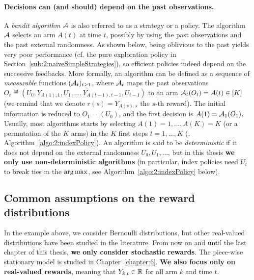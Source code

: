 \paragraph{Decisions can (and should) depend on the past observations.}

A \emph{bandit algorithm} $\mathcal{A}$ is also referred to as a strategy or a policy.
The algorithm $\mathcal{A}$ selects an arm $A(t)$ at time $t$, possibly by using the past observations and the past external randomness.
As shown below, being oblivious to the past yields very poor performance (cf. the pure exploration policy in Section~\ref{sub:2:naiveSimpleStrategies}), so efficient policies indeed depend on the successive feedbacks.
%
More formally, an algorithm can be defined as a sequence of \emph{measurable} functions $(\mathcal{A}_t)_{t\geq1}$,
where $\mathcal{A}_t$ maps the past observations $O_t \eqdef (U_0, Y_{A(1),1}, U_1, \dots, Y_{A(t-1),t-1}, U_{t-1})$
to an arm $\mathcal{A}_t(O_t) \overset{.}{=} A(t) \in[K]$
(we remind that we denote $r(s) = Y_{A(s),s}$ the $s$-th reward).
The initial information is reduced to $O_1 = (U_0)$, and the first decision is $A(1) = \mathcal{A}_1(O_1)$. Usually, most algorithms starts by selecting $A(1)=1,\dots,A(K)=K$ (or a permutation of the $K$ arms) in the $K$ first steps $t=1,\dots,K$ (\eg, Algorithm~\ref{algo:2:indexPolicy}).
%
An algorithm is said to be \emph{deterministic} if it does not depend on the external randomness $U_0,U_1,\dots$, but in this thesis \textbf{we only use non-deterministic algorithms}
(in particular, index policies need $U_t$ to break ties in the $\operatorname*{arg\,max}$, see Algorithm~\ref{algo:2:indexPolicy} below).


\subsection{Common assumptions on the reward distributions}

In the example above, we consider Bernoulli distributions, but other real-valued distributions have been studied in the literature.
From now on and until the last chapter of this thesis, \textbf{we only consider stochastic rewards}. The piece-wise stationary model is studied in Chapter~\ref{chapter:6}.
%
\textbf{We also focus only on real-valued rewards}, meaning that $Y_{k,t}\in\mathbb{R}$ for all arm $k$ and time $t$.

